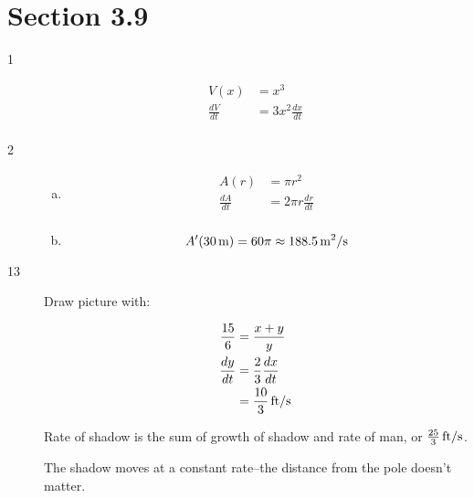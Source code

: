 \documentclass[letterpaper, landscape]{exam}
\begin{document}
  \section{Section 3.9} %

  \begin{description}

    \item[1]
      \begin{align*}
        V(x)          & = x^3 \\
        \frac{dV}{dt} & = \boxed{ 3x^2 \frac{dx}{dt} } \\
      \end{align*}

    \item[2]
      \begin{enumerate}[(a)]
        \item 
          \begin{align*}
            A(r)          & = \pi r^2 \\
            \frac{dA}{dt} & = \boxed{ 2 \pi r \frac{dr}{dt} } \\
          \end{align*}

        \item 
          \[
            A'(\unit[30]{m}) = 60 \pi \approx \unit[188.5]{m^2/s}
          \]
      \end{enumerate}

    \item[13]
      Draw picture with:

      \begin{align*}
        \frac{15}{6}  & = \frac{x + y}{y} \\
        \frac{dy}{dt} & = \frac{2}{3} \frac{dx}{dt} \\
                      & = \unit[\frac{10}{3}]{ft/s} \\
      \end{align*}

      Rate of shadow is the sum of growth of shadow and rate of man, or $\unit[\frac{25}{3}]{ft/s}$.

      The shadow moves at a constant rate--the distance from the pole doesn't matter.


\end{description}
\end{document}
